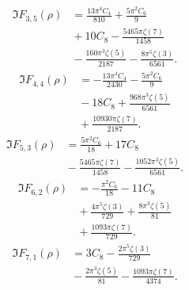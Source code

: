 \begin{align*}
\Im F_{3,5}(\rho) &=\frac{13 \pi^{4} C_{4}}{810}+\frac{5 \pi^{2} C_{6}}{9} \\
 &{}+10 C_{8}-\frac{5465 \pi \zeta\left(7\right)}{1458} \\
 &{}-\frac{160 \pi^{3} \zeta\left(5\right)}{2187}-\frac{8 \pi^{5} \zeta\left(3\right)}{6561}.
\end{align*}
\begin{align*}
\Im F_{4,4}(\rho) &=-\frac{13 \pi^{4} C_{4}}{2430}-\frac{5 \pi^{2} C_{6}}{9} \\
 &{}-18 C_{8}+\frac{968 \pi^{3} \zeta\left(5\right)}{6561} \\
 &{}+\frac{10930 \pi \zeta\left(7\right)}{2187}.
\end{align*}
\begin{align*}
\Im F_{5,3}(\rho) &=\frac{5 \pi^{2} C_{6}}{18}+17 C_{8} \\
 &{}-\frac{5465 \pi \zeta\left(7\right)}{1458}-\frac{1052 \pi^{3} \zeta\left(5\right)}{6561}.
\end{align*}
\begin{align*}
\Im F_{6,2}(\rho) &=-\frac{\pi^{2} C_{6}}{18}-11 C_{8} \\
 &{}+\frac{4 \pi^{5} \zeta\left(3\right)}{729}+\frac{8 \pi^{3} \zeta\left(5\right)}{81} \\
 &{}+\frac{1093 \pi \zeta\left(7\right)}{729}.
\end{align*}
\begin{align*}
\Im F_{7,1}(\rho) &=3 C_{8}-\frac{2 \pi^{5} \zeta\left(3\right)}{729} \\
 &{}-\frac{2 \pi^{3} \zeta\left(5\right)}{81}-\frac{1093 \pi \zeta\left(7\right)}{4374}.
\end{align*}
